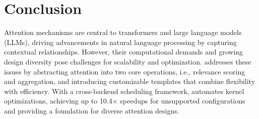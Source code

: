 \section{Conclusion}
\label{sec:conclusion}

Attention mechanisms are central to transformers and large language models (LLMs), driving advancements in natural language processing by capturing contextual relationships. However, their computational demands and growing design diversity pose challenges for scalability and optimization. \oursys{} addresses these issues by abstracting attention into two core operations, i.e., relevance scoring and aggregation, and introducing customizable templates that combine flexibility with efficiency. With a cross-backend scheduling framework, \oursys{} automates kernel optimizations, achieving up to 10.4$\times$ speedups for unsupported configurations and providing a foundation for diverse attention designs.